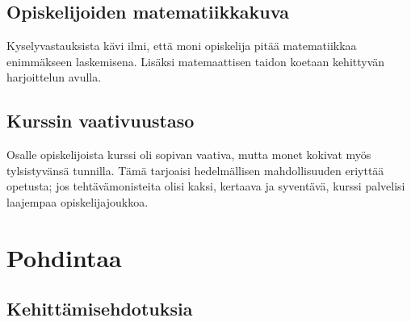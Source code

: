 \documentclass[a4paper,12pt,leqno,titlepage]{article}
\begin{document}
\subsection{Opiskelijoiden matematiikkakuva}
Kyselyvastauksista kävi ilmi, että moni opiskelija pitää matematiikkaa enimmäkseen laskemisena.
Lisäksi matemaattisen taidon koetaan kehittyvän harjoittelun avulla.

\subsection{Kurssin vaativuustaso}
Osalle opiskelijoista kurssi oli sopivan vaativa, mutta monet kokivat myös tylsistyvänsä tunnilla.
Tämä tarjoaisi hedelmällisen mahdollisuuden eriyttää opetusta; jos tehtävämonisteita olisi kaksi, kertaava ja syventävä, kurssi palvelisi laajempaa opiskelijajoukkoa.


\pagebreak
\section{Pohdintaa}

\subsection{Kehittämisehdotuksia}

\pagebreak

\printbibliography


\end{document}
